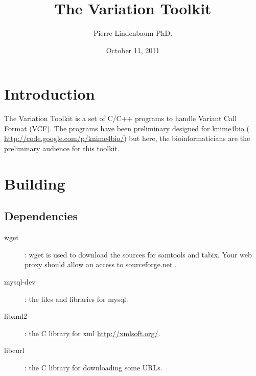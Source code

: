 \documentclass[12pt]{article}
\title{The Variation Toolkit}
\author{Pierre Lindenbaum PhD.}
\date{October 11, 2011}
\begin{document}
\maketitle
\section{Introduction}
The Variation Toolkit is a set of C/C++ programs to handle Variant Call Format (VCF).
The programs have been preliminary designed for knime4bio ( \url{http://code.google.com/p/knime4bio/})
but here, the bioinformaticians are the preliminary audience for this toolkit.
\section{Building}
\subsection{Dependencies}
\begin{description}
\item[wget]: wget is used to download the sources for samtools and tabix.
Your web proxy should allow an access to sourceforge.net .
\item[mysql-dev]: the files and libraries for mysql.
\item[libxml2]: the C library for xml \url{http://xmlsoft.org/}.
\item[libcurl]: the C library for downloading some URLs.
\end{description}
\end{document}
